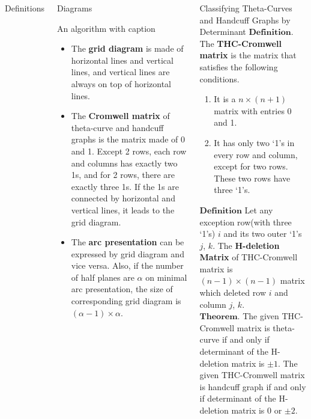 \documentclass[final]{beamer}
\begin{document}
\begin{frame}[t]
\begin{columns}[t]
\begin{block}{Definitions}
  \end{block}
  \begin{block}{Diagrams}

    \begin{Diagrams}
      \caption{An algorithm with caption}\label{alg:cap}
      \begin{itemize} 
        \item The \textbf{grid diagram} is made of horizontal lines and vertical lines, and vertical lines are always on top of horizontal lines.
        \item The \textbf{Cromwell matrix} of theta-curve and handcuff graphs is the matrix made of 0 and 1.
        Except 2 rows, each row and columns has exactly two 1s, and for 2 rows, there are exactly three 1s.
        If the 1s are connected by horizontal and vertical lines, it leads to the grid diagram.
        \item The \textbf{arc presentation} can be expressed by grid diagram and vice versa.
        Also, if the number of half planes are $\alpha$ on minimal arc presentation, the size of corresponding grid diagram is $(\alpha - 1) \times \alpha$.\\
      \end{itemize} 
    \end{Diagrams}

  \end{block}
  \begin{block}{Classifying Theta-Curves and Handcuff Graphs by Determinant}
    $\mathbf{Definition.}$ The \textbf{THC-Cromwell matrix} is the matrix that satisfies the following conditions.
    \begin{enumerate}
      \item It is a $n\times(n+1)$ matrix with entries 0 and 1.
      \item It has only two `1's in every row and column, except for two rows. These two rows have three `1's.
    \end{enumerate}
    $\mathbf{Definition}$ Let any exception row(with three `1's) $i$ and its two outer `1's $j$, $k$.
    The \textbf{H-deletion Matrix} of THC-Cromwell matrix is $(n-1)\times(n-1)$ matrix which deleted row $i$ and column $j$, $k$.\\
    $\mathbf{Theorem.}$ The given THC-Cromwell matrix is theta-curve if and only if determinant of the H-deletion matrix is $\pm 1$.
    The given THC-Cromwell matrix is handcuff graph if and only if determinant of the H-deletion matrix is $0$ or $\pm 2$.\\
  \end{block}
\end{columns}


\end{frame}
\end{document}
